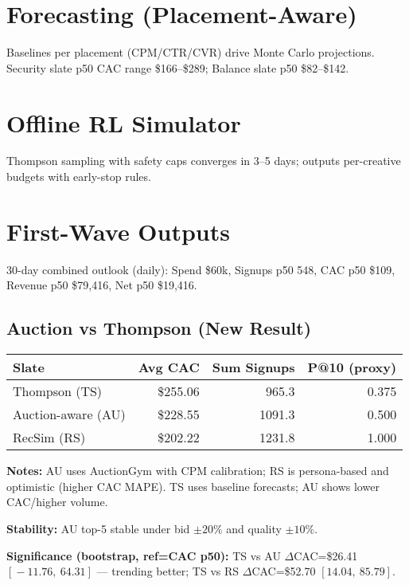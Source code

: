 \documentclass[11pt,a4paper]{report}
\begin{document}
\chapter{Forecasting (Placement-Aware)}
Baselines per placement (CPM/CTR/CVR) drive Monte Carlo projections. Security slate p50 CAC range \$166--\$289; Balance slate p50 \$82--\$142.

\chapter{Offline RL Simulator}
Thompson sampling with safety caps converges in 3--5 days; outputs per-creative budgets with early-stop rules.

\chapter{First-Wave Outputs}
30-day combined outlook (daily): Spend \$60k, Signups p50 548, CAC p50 \$109, Revenue p50 \$79,416, Net p50 \$19,416.

\section*{Auction vs Thompson (New Result)}
\begin{metricbox}
\begin{tabular}{lrrr}
\toprule
\textbf{Slate} & \textbf{Avg CAC} & \textbf{Sum Signups} & \textbf{P@10 (proxy)} \\
\midrule
Thompson (TS) & \$255.06 & 965.3 & 0.375 \\
Auction-aware (AU) & \$228.55 & 1091.3 & 0.500 \\
RecSim (RS) & \$202.22 & 1231.8 & 1.000 \\
\bottomrule
\end{tabular}

\vspace{0.6em}
\textbf{Notes:} AU uses AuctionGym with CPM calibration; RS is persona-based and optimistic (higher CAC MAPE). TS uses baseline forecasts; AU shows lower CAC/higher volume.\par
\textbf{Stability:} AU top-5 stable under bid \(\pm 20\%\) and quality \(\pm 10\%\).\par
\textbf{Significance (bootstrap, ref=CAC p50):} TS vs AU \(\Delta\)CAC=\$26.41 \([\!-\!11.76,\ 64.31]\) — trending better; TS vs RS \(\Delta\)CAC=\$52.70 \([14.04,\ 85.79]\).\par
\end{metricbox}
\end{document}
